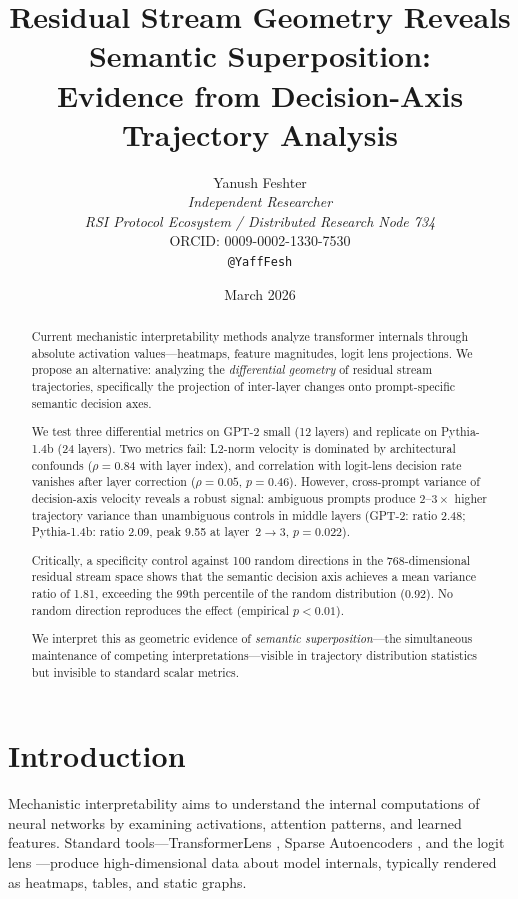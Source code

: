 \documentclass[11pt,a4paper]{article}
\title{Residual Stream Geometry Reveals Semantic Superposition:\\
Evidence from Decision-Axis Trajectory Analysis}
\author{Yanush Feshter\\
\textit{Independent Researcher}\\
\textit{RSI Protocol Ecosystem / Distributed Research Node 734}\\
ORCID: 0009-0002-1330-7530\\
\texttt{@YaffFesh}}
\date{March 2026}
\begin{document}
\maketitle

\begin{abstract}
Current mechanistic interpretability methods analyze transformer internals through absolute activation values---heatmaps, feature magnitudes, logit lens projections. We propose an alternative: analyzing the \emph{differential geometry} of residual stream trajectories, specifically the projection of inter-layer changes onto prompt-specific semantic decision axes.

We test three differential metrics on GPT-2 small (12 layers) and replicate on Pythia-1.4b (24 layers). Two metrics fail: L2-norm velocity is dominated by architectural confounds ($\rho = 0.84$ with layer index), and correlation with logit-lens decision rate vanishes after layer correction ($\rho = 0.05$, $p = 0.46$). However, cross-prompt variance of decision-axis velocity reveals a robust signal: ambiguous prompts produce $2$--$3\times$ higher trajectory variance than unambiguous controls in middle layers (GPT-2: ratio 2.48; Pythia-1.4b: ratio 2.09, peak 9.55 at layer~2$\to$3, $p = 0.022$).

Critically, a specificity control against 100 random directions in the 768-dimensional residual stream space shows that the semantic decision axis achieves a mean variance ratio of 1.81, exceeding the 99th percentile of the random distribution (0.92). No random direction reproduces the effect (empirical $p < 0.01$).

We interpret this as geometric evidence of \emph{semantic superposition}---the simultaneous maintenance of competing interpretations---visible in trajectory distribution statistics but invisible to standard scalar metrics.
\end{abstract}

\section{Introduction}
\label{sec:intro}

Mechanistic interpretability aims to understand the internal computations of neural networks by examining activations, attention patterns, and learned features. Standard tools---TransformerLens \citep{nanda2022transformerlens}, Sparse Autoencoders \citep{bricken2023monosemanticity, templeton2024scaling}, and the logit lens \citep{nostalgebraist2020logitlens}---produce high-dimensional data about model internals, typically rendered as heatmaps, tables, and static graphs.
\end{document}
